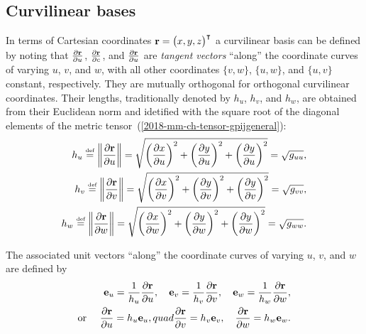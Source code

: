 \subsection{Curvilinear bases}

In terms of Cartesian coordinates
${\bf r}= \begin{pmatrix}x,y,z\end{pmatrix}^\intercal$
a curvilinear basis
can be defined by noting that
$
\frac{\partial  {\bf r}}{\partial u}$,
$\frac{\partial  {\bf r}}{\partial c}$, and
$\frac{\partial  {\bf r}}{\partial u}$
are {\em tangent vectors} ``along''  the coordinate curves of varying
$u$, $v$, and $w$, with all other coordinates $\{ v,w \}$, $\{ u,w \}$, and $\{ u,v \}$ constant, respectively.
They are mutually orthogonal for orthogonal curvilinear coordinates.
Their lengths, traditionally denoted by $h_u$, $h_v$, and $h_w$, are obtained from their Euclidean norm
and idetified with the square root of the diagonal elements of the metric tensor~(\ref{2018-mm-ch-tensor-gpijgeneral}):
\begin{equation}
\begin{split}
h_u \stackrel{{\text{\tiny def}}}{=}   \left\| \frac{\partial  {\bf r}}{\partial u} \right\| =
\sqrt{ \left(\frac{\partial  x}{\partial u}\right)^2+
  \left(\frac{\partial  y}{\partial u}\right)^2+
  \left(\frac{\partial  y}{\partial u}\right)^2}  = \sqrt{g_{uu}}
,        \\
h_v \stackrel{{\text{\tiny def}}}{=}    \left\| \frac{\partial  {\bf r}}{\partial v} \right\| =
\sqrt{ \left(\frac{\partial  x}{\partial v}\right)^2+
  \left(\frac{\partial  y}{\partial v}\right)^2+
  \left(\frac{\partial  y}{\partial v}\right)^2} =\sqrt{g_{vv}}
,        \\
h_w \stackrel{{\text{\tiny def}}}{=}    \left\| \frac{\partial  {\bf r}}{\partial w} \right\| =
\sqrt{ \left(\frac{\partial  x}{\partial w}\right)^2+
  \left(\frac{\partial  y}{\partial w}\right)^2+
  \left(\frac{\partial  y}{\partial w}\right)^2}  =\sqrt{g_{ww}}
.
\end{split}
\label{2018-mm-ch-tensor-l}
\end{equation}

The associated unit vectors ``along''  the coordinate curves of varying
$u$, $v$, and $w$ are defined by
\begin{equation}
\begin{split}
{\bf e}_u = \frac{1}{ h_u } \frac{\partial  {\bf r}}{\partial u},\quad
{\bf e}_v = \frac{1}{ h_v } \frac{\partial  {\bf r}}{\partial v},\quad
{\bf e}_w = \frac{1}{ h_w } \frac{\partial  {\bf r}}{\partial w},
\\
\text{or }\quad
\frac{\partial  {\bf r}}{\partial u} = h_u {\bf e}_u,quad
\frac{\partial  {\bf r}}{\partial v} = h_v {\bf e}_v,\quad
\frac{\partial  {\bf r}}{\partial w} = h_w {\bf e}_w
.
\end{split}
\label{2018-mm-ch-tensor-uv}
\end{equation}

